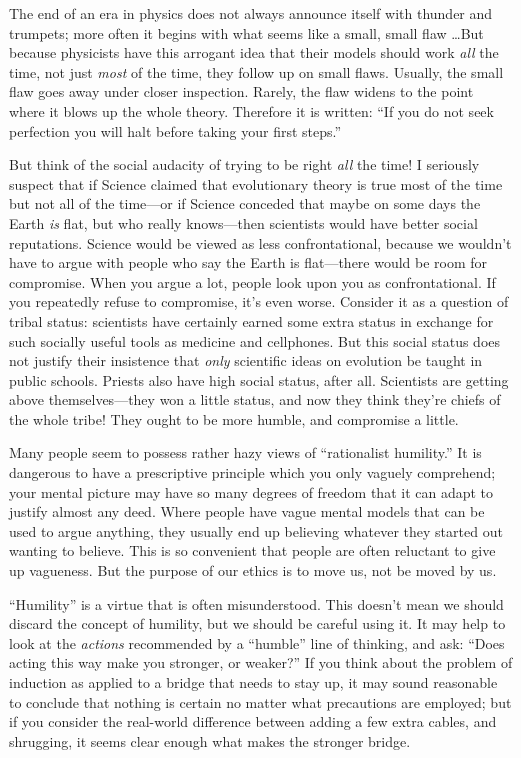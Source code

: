 {
 The end of an era in physics does not always announce itself with
thunder and trumpets; more often it begins with what seems like a
small, small flaw \ldots But because physicists have this arrogant idea
that their models should work \textit{all} the time, not just
\textit{most} of the time, they follow up on small flaws. Usually, the
small flaw goes away under closer inspection. Rarely, the flaw widens
to the point where it blows up the whole theory. Therefore it is
written: ``If you do not seek perfection you will halt
before taking your first steps.''}

{
 But think of the social audacity of trying to be right
\textit{all} the time! I seriously suspect that if Science claimed that
evolutionary theory is true most of the time but not all of the
time---or if Science conceded that maybe on some days the Earth
\textit{is} flat, but who really knows---then scientists would have
better social reputations. Science would be viewed as less
confrontational, because we wouldn't have to argue with
people who say the Earth is flat---there would be room for compromise.
When you argue a lot, people look upon you as confrontational. If you
repeatedly refuse to compromise, it's even worse.
Consider it as a question of tribal status: scientists have certainly
earned some extra status in exchange for such socially useful tools as
medicine and cellphones. But this social status does not justify their
insistence that \textit{only} scientific ideas on evolution be taught
in public schools. Priests also have high social status, after all.
Scientists are getting above themselves---they won a little status, and
now they think they're chiefs of the whole tribe! They
ought to be more humble, and compromise a little.}

{
 Many people seem to possess rather hazy views of
``rationalist humility.'' It is
dangerous to have a prescriptive principle which you only vaguely
comprehend; your mental picture may have so many degrees of freedom
that it can adapt to justify almost any deed. Where people have vague
mental models that can be used to argue anything, they usually end up
believing whatever they started out wanting to believe. This is so
convenient that people are often reluctant to give up vagueness. But
the purpose of our ethics is to move us, not be moved by us.}

{
 ``Humility'' is a virtue that
is often misunderstood. This doesn't mean we should
discard the concept of humility, but we should be careful using it. It
may help to look at the \textit{actions} recommended by a
``humble'' line of thinking, and
ask: ``Does acting this way make you stronger, or
weaker?'' If you think about the problem of induction
as applied to a bridge that needs to stay up, it may sound reasonable
to conclude that nothing is certain no matter what precautions are
employed; but if you consider the real-world difference between adding
a few extra cables, and shrugging, it seems clear enough what makes the
stronger bridge.}


